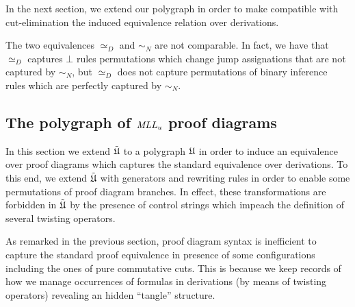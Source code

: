 \documentclass[a4paper]{article}
\begin{document}
In the next section, we extend our polygraph in order to make compatible with cut-elimination the induced equivalence relation over derivations.


\begin{oss}
The two equivalences $\simeq_D$ and $\sim_N$ are not comparable. In fact, we have that $\simeq_{ D}$ captures $\bot$ rules  permutations which change jump assignations that are not captured by $\sim_N $, but $\simeq_{D}$ does not capture permutations of binary inference rules which are perfectly captured by $\sim_N$.
\end{oss}
\subsection{The polygraph of $\mathit{MLL_u}$ proof diagrams}

In this section  we extend ${\tilde{\mathfrak{U}}}$ to a polygraph $\mathfrak{U}$ in order to induce an equivalence over  proof diagrams which captures the standard equivalence over derivations. To this end,  we extend ${\tilde{\mathfrak{U}}}$ with  generators and rewriting rules  in order to  enable some permutations of proof diagram branches. In effect, these transformations are forbidden in ${\tilde{\mathfrak{U}}}$ by the presence of control strings which  impeach the definition of several twisting operators.

As remarked in the previous section, proof diagram syntax is inefficient to capture the standard proof equivalence in presence of some configurations including the ones of pure commutative cuts. This is because we keep records of how we manage occurrences of formulas in derivations (by means of twisting operators) revealing an  hidden ``tangle'' structure. 
\end{document}
